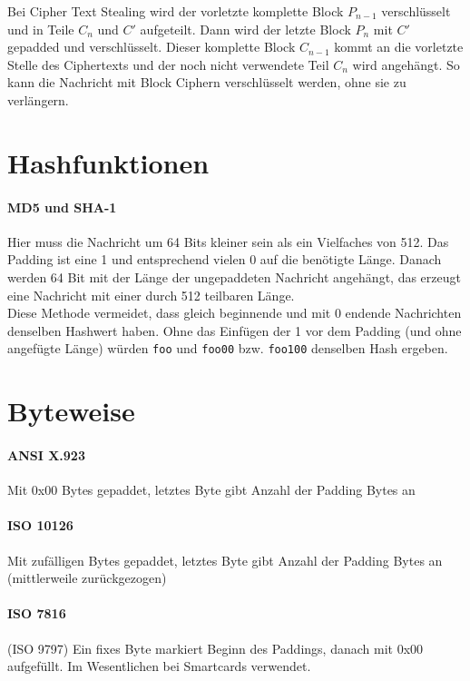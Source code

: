 Bei Cipher Text Stealing wird der vorletzte komplette Block $P_{n-1}$ verschlüsselt und in Teile $C_n$ und $C'$ aufgeteilt. 
Dann wird der letzte Block $P_n$ mit $C'$ gepadded und verschlüsselt. Dieser komplette Block $C_{n-1}$ kommt an die vorletzte Stelle des Ciphertexts und der noch nicht 
verwendete Teil $C_n$ wird angehängt. So kann die Nachricht mit Block Ciphern verschlüsselt werden, ohne sie zu verlängern.

\section{Hashfunktionen}

\paragraph{MD5 und SHA-1} Hier muss die Nachricht um 64 Bits kleiner sein als ein Vielfaches von 512.
Das Padding ist eine 1 und entsprechend vielen 0 auf die benötigte Länge. Danach werden 64 Bit mit der Länge der ungepaddeten Nachricht angehängt, das erzeugt eine 
Nachricht mit einer durch 512 teilbaren Länge. \\

\noindent Diese Methode vermeidet, dass gleich beginnende und mit 0 endende Nachrichten denselben
Hashwert haben. Ohne das Einfügen der 1 vor dem Padding (und ohne angefügte Länge)
würden \verb|foo| und \verb|foo00| bzw. \verb|foo100| denselben Hash ergeben.

\section{Byteweise}

\paragraph{ANSI X.923} Mit 0x00 Bytes gepaddet, letztes Byte gibt Anzahl der Padding Bytes an

\paragraph{ISO 10126} Mit zufälligen Bytes gepaddet, letztes Byte gibt Anzahl der Padding Bytes
an (mittlerweile zurückgezogen)

\paragraph{ISO 7816} (ISO 9797) Ein fixes Byte markiert Beginn des
Paddings, danach mit 0x00 aufgefüllt. Im Wesentlichen bei Smartcards
verwendet.

